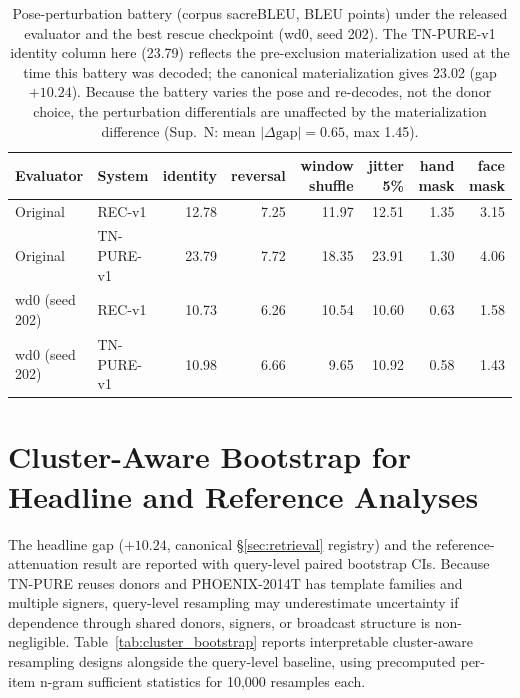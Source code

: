 \documentclass[pdflatex,sn-chicago]{sn-jnl}
\begin{document}
\begin{table}[h]
\centering
\scriptsize\setlength{\tabcolsep}{3pt}
\caption{Pose-perturbation battery (corpus sacreBLEU, BLEU points) under the released evaluator and the best rescue checkpoint (wd0, seed 202). The TN-PURE-v1 identity column here (23.79) reflects the pre-exclusion materialization used at the time this battery was decoded; the canonical materialization gives 23.02 (gap $+10.24$). Because the battery varies the pose and re-decodes, not the donor choice, the perturbation differentials are unaffected by the materialization difference (Sup.~N: mean $|\Delta\text{gap}| = 0.65$, max 1.45).}
\label{tab:perturbation}
\begin{tabular}{llrrrrrr}
\toprule
Evaluator & System & identity & reversal & window shuffle & jitter 5\% & hand mask & face mask \\
\midrule
Original & REC-v1 & 12.78 & 7.25 & 11.97 & 12.51 & 1.35 & 3.15 \\
Original & TN-PURE-v1 & 23.79 & 7.72 & 18.35 & 23.91 & 1.30 & 4.06 \\
wd0 (seed 202) & REC-v1 & 10.73 & 6.26 & 10.54 & 10.60 & 0.63 & 1.58 \\
wd0 (seed 202) & TN-PURE-v1 & 10.98 & 6.66 & 9.65 & 10.92 & 0.58 & 1.43 \\
\bottomrule
\end{tabular}
\end{table}

\section{Cluster-Aware Bootstrap for Headline and Reference Analyses}
\label{sec:appendix_cluster_bootstrap}
The headline gap ($+10.24$, canonical \S\ref{sec:retrieval} registry) and the reference-attenuation result are reported with query-level paired bootstrap CIs. Because TN-PURE reuses donors and PHOENIX-2014T has template families and multiple signers, query-level resampling may underestimate uncertainty if dependence through shared donors, signers, or broadcast structure is non-negligible. Table~\ref{tab:cluster_bootstrap} reports interpretable cluster-aware resampling designs alongside the query-level baseline, using precomputed per-item n-gram sufficient statistics for 10{,}000 resamples each.
\end{document}
